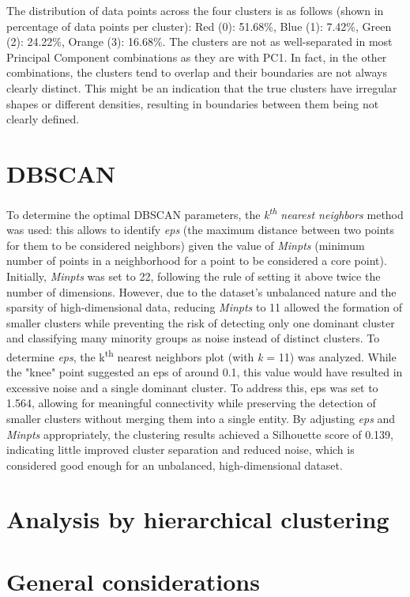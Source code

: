The distribution of data points across the four clusters is as follows (shown in percentage of data points per cluster):
Red (0): 51.68\%, Blue (1): 7.42\%, Green (2): 24.22\%, Orange (3): 16.68\%.
The clusters are not as well-separated in most Principal Component combinations as they are with PC1. 
In fact, in the other combinations, the clusters tend to overlap and their boundaries are not always clearly distinct.
This might be an indication that the true clusters have irregular shapes or different densities, resulting in boundaries between them being not clearly defined.



\section{DBSCAN}\label{sec:density_based}
To determine the optimal DBSCAN parameters, the \textit{k\textsuperscript{th} nearest neighbors} method was used: this allows to identify \textit{eps} (the maximum distance between two points for them to be considered neighbors) given the value of \textit{Minpts} (minimum number of points in a neighborhood for a point to be considered a core point).
Initially, \textit{Minpts} was set to 22, following the rule of setting it above twice the number of dimensions. 
However, due to the dataset's unbalanced nature and the sparsity of high-dimensional data, reducing \textit{Minpts} to 11 allowed the formation of smaller clusters while preventing the risk of detecting only one dominant cluster and classifying many minority groups as noise instead of distinct clusters.
To determine \textit{eps}, the k\textsuperscript{th} nearest neighbors plot (with \textit{k} = 11) was analyzed. While the "knee" point suggested an eps of around 0.1, this value would have resulted in excessive noise and a single dominant cluster. To address this, eps was set to 1.564, allowing for meaningful connectivity while preserving the detection of smaller clusters without merging them into a single entity. 
By adjusting \textit{eps} and \textit{Minpts} appropriately, the clustering results achieved a Silhouette score of 0.139, indicating little improved cluster separation and reduced noise, which is considered good enough for an unbalanced, high-dimensional dataset.






\section{Analysis by hierarchical clustering}\label{sec:hierarchical}


\section{General considerations}\label{sec:considerations}